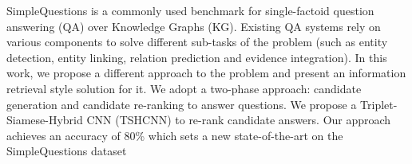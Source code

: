 SimpleQuestions is a commonly used benchmark for single-factoid question answering (QA) over Knowledge Graphs (KG). Existing QA systems rely on various components to solve different sub-tasks of the problem (such as entity detection, entity linking, relation prediction and evidence integration). In this work, we propose a different approach to the problem and present an information retrieval style solution for it. We adopt a two-phase approach: candidate generation and candidate re-ranking to answer questions. We propose a Triplet-Siamese-Hybrid CNN (TSHCNN) to re-rank candidate answers. Our approach achieves an accuracy of 80\% which sets a new state-of-the-art on the SimpleQuestions dataset
